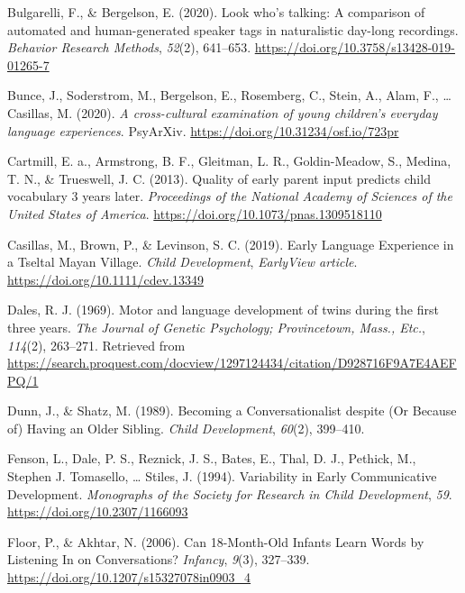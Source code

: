 \documentclass[
  english,
  man,floatsintext]{apa6}
\newlength{\cslhangindent}
\newlength{\cslentryspacingunit} %
\newenvironment{CSLReferences}[2] %
 {%
  \setlength{\parindent}{0pt}
  \ifodd #1
  \let\oldpar\par
  \def\par{\hangindent=\cslhangindent\oldpar}
  \fi
  \setlength{\parskip}{#2\cslentryspacingunit}
 }%
 {}
\begin{document}
\begin{CSLReferences}{1}{0}
\leavevmode{}%
Bulgarelli, F., \& Bergelson, E. (2020). Look who's talking: {A} comparison of automated and human-generated speaker tags in naturalistic day-long recordings. \emph{Behavior Research Methods}, \emph{52}(2), 641--653. \url{https://doi.org/10.3758/s13428-019-01265-7}

\leavevmode{}%
Bunce, J., Soderstrom, M., Bergelson, E., Rosemberg, C., Stein, A., Alam, F., \ldots{} Casillas, M. (2020). \emph{A cross-cultural examination of young children's everyday language experiences}. {PsyArXiv}. \url{https://doi.org/10.31234/osf.io/723pr}

\leavevmode{}%
Cartmill, E. a., Armstrong, B. F., Gleitman, L. R., Goldin-Meadow, S., Medina, T. N., \& Trueswell, J. C. (2013). Quality of early parent input predicts child vocabulary 3 years later. \emph{Proceedings of the National Academy of Sciences of the United States of America}. \url{https://doi.org/10.1073/pnas.1309518110}

\leavevmode{}%
Casillas, M., Brown, P., \& Levinson, S. C. (2019). Early {Language} {Experience} in a {Tseltal} {Mayan} {Village}. \emph{Child Development}, \emph{EarlyView article}. \url{https://doi.org/10.1111/cdev.13349}

\leavevmode{}%
Dales, R. J. (1969). Motor and language development of twins during the first three years. \emph{The Journal of Genetic Psychology; Provincetown, Mass., Etc.}, \emph{114}(2), 263--271. Retrieved from \url{https://search.proquest.com/docview/1297124434/citation/D928716F9A7E4AEFPQ/1}

\leavevmode{}%
Dunn, J., \& Shatz, M. (1989). Becoming a {Conversationalist} despite ({Or} {Because} of) {Having} an {Older} {Sibling}. \emph{Child Development}, \emph{60}(2), 399--410.

\leavevmode{}%
Fenson, L., Dale, P. S., Reznick, J. S., Bates, E., Thal, D. J., Pethick, M., Stephen J. Tomasello, \ldots{} Stiles, J. (1994). Variability in {Early} {Communicative} {Development}. \emph{Monographs of the Society for Research in Child Development}, \emph{59}. \url{https://doi.org/10.2307/1166093}

\leavevmode{}%
Floor, P., \& Akhtar, N. (2006). Can 18-{Month}-{Old} {Infants} {Learn} {Words} by {Listening} {In} on {Conversations}? \emph{Infancy}, \emph{9}(3), 327--339. \url{https://doi.org/10.1207/s15327078in0903_4}


\end{CSLReferences}
\end{document}

